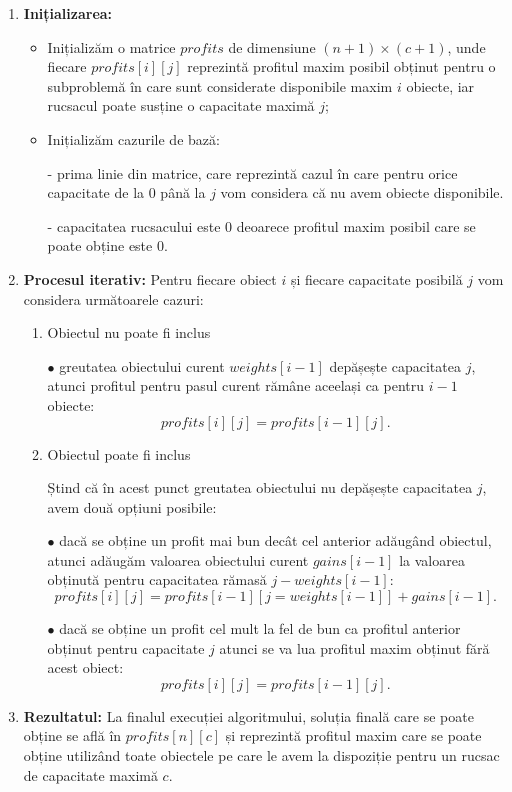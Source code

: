 \begin{sloppypar}
\begin{tcolorbox}[mystyle]
\begin{enumerate}[left=0.2em]
    \item \textbf{Inițializarea:}
    \begin{itemize}
        \item Inițializăm o matrice \(profits\) de dimensiune \((n + 1) \times (c + 1)\), unde fiecare \( profits[i][j]\) reprezintă profitul maxim posibil obținut pentru o subproblemă în care sunt considerate disponibile maxim \(i\) obiecte, iar rucsacul poate susține o capacitate maximă \(j\);
        \item Inițializăm cazurile de bază:
        \par - prima linie din matrice, care reprezintă cazul în care pentru orice capacitate de la \(0\) până la \(j\) vom considera că nu avem obiecte disponibile. 
        \par - capacitatea rucsacului este \(0\) deoarece profitul maxim posibil care se poate obține este \(0\).
    \end{itemize}
    \item \textbf{Procesul iterativ:}
    Pentru fiecare obiect \(i\) și fiecare capacitate posibilă \(j\) vom considera următoarele cazuri:
    \begin{enumerate}
        \item Obiectul nu poate fi inclus \par
            $\bullet$ greutatea obiectului curent \(weights[i - 1]\) depășește capacitatea \(j\), atunci profitul pentru pasul curent rămâne aceelași ca pentru \(i - 1\) obiecte: \[profits[i][j] = profits[i - 1][j].\]
        \item Obiectul poate fi inclus \par
        Ștind că în acest punct greutatea obiectului nu depășește capacitatea \(j\), avem două opțiuni posibile: \par
        $\bullet$ dacă se obține un profit mai bun decât cel anterior adăugând obiectul, atunci adăugăm valoarea obiectului curent \(gains[i - 1]\) la valoarea obținută pentru capacitatea rămasă \(j - weights[i - 1]\): \[profits[i][j] = profits[i - 1][j = weights[i - 1]] + gains[i - 1].\] \par
        $\bullet$ dacă se obține un profit cel mult la fel de bun ca profitul anterior obținut pentru capacitate \(j\) atunci se va lua profitul maxim obținut fără acest obiect: \[profits[i][j] = profits[i - 1][j].\] 
    \end{enumerate}
    \item \textbf{Rezultatul:}
    La finalul execuției algoritmului, soluția finală care se poate obține se află în \(profits[n][c]\) și reprezintă profitul maxim care se poate obține utilizând toate obiectele pe care le avem la dispoziție pentru un rucsac de capacitate maximă \(c\).
\end{enumerate}
\end{tcolorbox}


\end{sloppypar}
